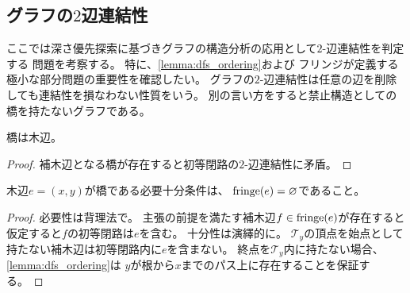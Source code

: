 











\subsection{グラフの\texorpdfstring{$2$}-辺連結性}
ここでは深さ優先探索に基づきグラフの構造分析の応用として$2$-辺連結性を判定する
問題を考察する。
特に、\cref{lemma:dfs_ordering}および%
フリンジが定義する極小な部分問題の重要性を確認したい。
グラフの$2$-辺連結性は任意の辺を削除しても連結性を損なわない性質をいう。
別の言い方をすると禁止構造としての橋を持たないグラフである。




\begin{lemma}\label{lemma:bridge_is_tree_edge}
橋は木辺。
\end{lemma}
\begin{proof}
補木辺となる橋が存在すると初等閉路の$2$-辺連結性に矛盾。
\end{proof}

\begin{lemma}\label{lemma:no_bridge_has_illegal_cotree_edges}
木辺$e=(x, y)$が橋である必要十分条件は、
$\operatorname{fringe}(e)=\varnothing$であること。
\end{lemma}
\begin{proof}
必要性は背理法で。
主張の前提を満たす補木辺$f\in\operatorname{fringe}(e)$が存在すると仮定すると$f$の初等閉路は$e$を含む。
十分性は演繹的に。
${\mathcal T}_y$の頂点を始点として持たない補木辺は初等閉路内に$e$を含まない。
終点を${\mathcal T}_y$内に持たない場合、
\cref{lemma:dfs_ordering}は
$y$が根から$x$までのパス上に存在することを保証する。
\end{proof}

